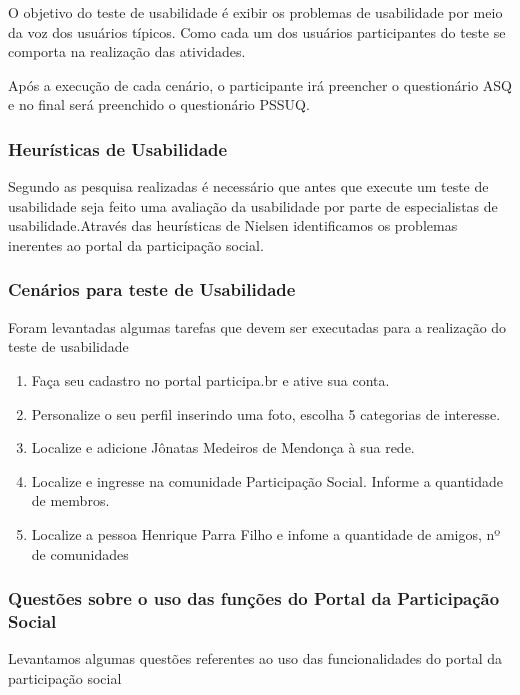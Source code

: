 O objetivo do teste de usabilidade é exibir os problemas de usabilidade por meio da voz dos usuários típicos. Como cada um dos usuários participantes do teste se comporta na realização das atividades.

Após a execução de cada cenário, o participante irá preencher o questionário ASQ e no final será preenchido o questionário PSSUQ.

\subsubsection{Heurísticas de Usabilidade}

	Segundo as pesquisa realizadas é necessário que antes que execute um teste de usabilidade seja feito uma avaliação da usabilidade por parte de especialistas de usabilidade.Através das heurísticas de Nielsen identificamos os problemas inerentes ao portal da participação social.


\subsubsection{Cenários para teste de Usabilidade}

	Foram levantadas algumas tarefas que devem ser executadas para a realização do teste de usabilidade

\begin{enumerate}
	\item Faça seu cadastro no portal participa.br e ative sua conta.
	\item Personalize o seu perfil inserindo uma foto, escolha 5 categorias de interesse.
	\item Localize e adicione Jônatas Medeiros de Mendonça à sua rede.
	\item Localize e ingresse na comunidade Participação Social. Informe a quantidade de membros.
	\item Localize a pessoa Henrique Parra Filho e infome a quantidade de amigos, nº de comunidades 
\end{enumerate}

\subsubsection{Questões sobre o uso das funções do Portal da Participação Social}

	Levantamos algumas questões referentes ao uso das funcionalidades do portal da participação social	

